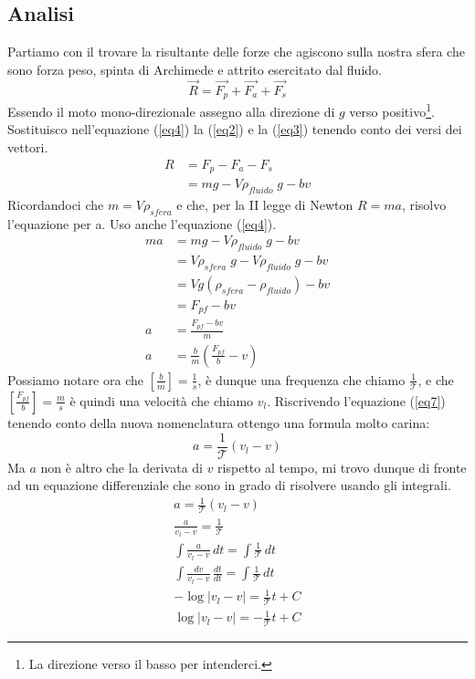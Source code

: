 \subsection{Analisi}
Partiamo con il trovare la risultante delle forze che agiscono sulla nostra sfera che sono forza peso, spinta di Archimede e attrito esercitato dal fluido.
\begin{equation}\label{eq5}
\vec{R} = \vec{F_p} + \vec{F_a} + \vec{F_s}
\end{equation}
Essendo il moto mono-direzionale assegno alla direzione di \(g\) verso positivo\footnote{La direzione verso il basso per intenderci.}. Sostituisco nell'equazione (\ref{eq4}) la (\ref{eq2}) e la (\ref{eq3}) tenendo conto dei versi dei vettori.
\begin{equation}\label{eq6}
    \begin{split}
    R &= F_p - F_a - F_s\\
            &= mg - V\rho_{fluido}\;g -bv
    \end{split}
\end{equation}
Ricordandoci che \(m=V\rho_{sfera}\) e che, per la II legge di Newton \(R = ma\), risolvo l'equazione per a. Uso anche l'equazione (\ref{eq4}).
\begin{equation}\label{eq7}
    \begin{split}
    ma  &= mg - V\rho_{fluido}\;g -bv\\
        &= V\rho_{sfera}\;g - V\rho_{fluido}\;g -bv\\   
        &= Vg(\rho_{sfera} - \rho_{fluido}) -bv\\
        &= F_{pf} - bv\\
    a   &= \frac{F_{pf} - bv}{m}\\
    a   &=\frac{b}{m}\left(\frac{F_{pf}}{b} - v\right)
    \end{split}
\end{equation}
Possiamo notare ora che \([\frac{b}{m}] = \frac{1}{s}\), è dunque una frequenza che chiamo \(\frac{1}{\mathcal{T}}\), e che \([\frac{F_{pf}}{b}] = \frac{m}{s}\) è quindi una velocità che chiamo \(v_l\). Riscrivendo l'equazione (\ref{eq7}) tenendo conto della nuova nomenclatura ottengo una formula molto carina:
\begin{equation}\label{eq8}
    a = \frac{1}{\mathcal{T}}\left(v_l - v\right)
\end{equation}
Ma \(a\) non è altro che la derivata di \(v\) rispetto al tempo, mi trovo dunque di fronte ad un equazione differenziale che sono in grado di risolvere usando gli integrali.
\begin{equation}\label{eq9}
    \begin{split}
    a = \frac{1}{\mathcal{T}}\left(v_l - v\right)\\
    \frac{a}{v_l - v} = \frac{1}{\mathcal{T}}\\
    \int\frac{a}{v_l - v}\,dt  = \int\frac{1}{\mathcal{T}}\,dt\\
    \int\frac{dv}{v_l - v}\,\frac{dt}{dt}  = \int\frac{1}{\mathcal{T}}\,dt\\
    -\log\lvert v_l - v \rvert = \frac{1}{\mathcal{T}}t + C\\
    \log\lvert v_l - v \rvert = -\frac{1}{\mathcal{T}}t + C
    \end{split}
\end{equation}
